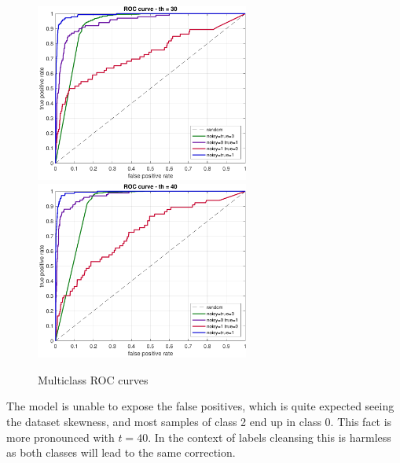 \documentclass[a4paper]{article}
\begin{document}
            \begin{figure}[H]
            \centering
            \includegraphics[width=7cm]{isnoisy/roc_multiclass_30}
            \includegraphics[width=7cm]{isnoisy/roc_multiclass_40}
            \caption{Multiclass ROC curves}
            \end{figure}
            The model is unable to expose the false positives, which is quite expected seeing the dataset skewness, and most samples of class 2 end up in class 0. This fact is more pronounced  with $t=40$. In the context of labels cleansing this is harmless as both classes will lead to the same correction.
\end{document}
